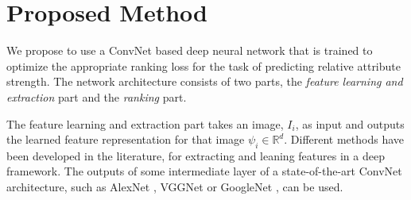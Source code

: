 

\section{Proposed Method}
\label{sec.3}

We propose to use a ConvNet based deep neural network that is trained to optimize the appropriate ranking loss for the task of predicting relative attribute strength. The network architecture consists of two parts, the \textit{feature learning and extraction} part and the \textit{ranking} part.

The feature learning and extraction part takes an image, $I_i$, as input and outputs the learned feature representation for that image $\psi_i \in \mathbb{R}^d$.
Different methods have been developed in the literature, for extracting and leaning features in a deep framework. The outputs of some intermediate layer of a state-of-the-art ConvNet architecture, such as AlexNet \cite{krizshevsky}, VGGNet \cite{verydeep} or GoogleNet \cite{googlenet},
can be used.


